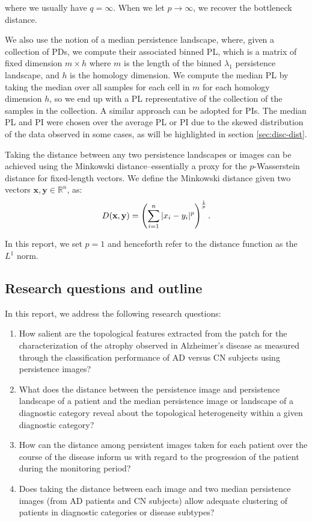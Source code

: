 \documentclass{article}
\begin{document}
where we usually have $q=\infty$. When we let $p\to\infty$, we recover the bottleneck distance.

We also use the notion of a median persistence landscape, where, given a collection of PDs, we
compute their associated binned PL, which is a matrix of fixed dimension $m\times h$ where $m$ is the
length of the binned $\lambda_1$ persistence landscape, and $h$ is the homology dimension. We compute the median PL by taking the
median over all samples for each cell in $m$ for each homology dimension $h$, so we end up with a PL
representative of the collection of the samples in the collection. A similar approach can be adopted
for PIs. The median PL and PI were chosen over the average PL or PI due to the skewed distribution of
the data observed in some cases, as will be highlighted in section \ref{sec:disc-dist}.

Taking the distance between any two persistence landscapes or images can be achieved using the
Minkowski distance--essentially a proxy for the $p$-Wasserstein distance for fixed-length vectors.
We define the Minkowski distance given two vectors $\mathbf{x},\mathbf{y}\in\mathbb{R}^n$, as:
\begin{equation}
  \label{eq:minkowski}
  D(\mathbf{x},\mathbf{y}) = \left(\sum_{i=1}^{n}|x_i-y_i|^p\right)^{1\over p}.
\end{equation}

In this report, we set $p=1$ and henceforth refer to the distance function as the $L^1$ norm.

\subsection{Research questions and outline}

In this report, we address the following research questions:

\begin{enumerate}
\item How salient are the topological features extracted from the patch for the characterization of
  the atrophy observed in Alzheimer's disease as measured through the classification performance of
AD versus CN subjects using persistence images?
\item What does the distance between the persistence image and persistence
landscape of a patient and the median persistence image or landscape of a
diagnostic category reveal about the topological heterogeneity within a given
diagnostic category?
\item How can the distance among persistent images taken for each patient over the course of the
  disease inform us with regard to the progression of the patient during the monitoring period?
\item Does taking the distance between each image and two median persistence
images (from AD patients and CN subjects) allow adequate clustering of patients
in diagnostic categories or disease subtypes?
\end{enumerate}
\end{document}
